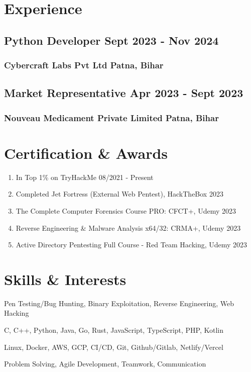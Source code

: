 \documentclass[11pt]{article} %
\begin{document}
\section{Experience}
\subsection{Python Developer \hfill Sept 2023 - Nov 2024}
\subsubsection{Cybercraft Labs Pvt Ltd \hfill Patna, Bihar}
\vspace{8pt}
\subsection{Market Representative \hfill Apr 2023 - Sept 2023}
\subsubsection{Nouveau Medicament Private Limited \hfill Patna, Bihar}

\vspace{18pt}

\section{Certification \& Awards}
\begin{enumerate}[label=\null, left=0pt..0pt, itemsep=0pt]
	\item In Top 1\% on TryHackMe \hfill 08/2021 - Present
  \item Completed Jet Fortress (External Web Pentest), HackTheBox \hfill 2023
	\item The Complete Computer Forensics Course PRO: CFCT+, Udemy \hfill 2023
	\item Reverse Engineering \& Malware Analysis x64/32: CRMA+, Udemy \hfill 2023
	\item Active Directory Pentesting Full Course - Red Team Hacking, Udemy \hfill 2023
\end{enumerate}

\section{Skills \& Interests}
\begin{description}[itemsep=0pt]
  \item[Hacking] Pen Testing/Bug Hunting, Binary Exploitation, Reverse Engineering, Web Hacking
	\item[Programming] C, C++, Python, Java, Go, Rust, JavaScript, TypeScript, PHP, Kotlin
	\item[DevOps] Linux, Docker, AWS, GCP, CI/CD, Git, Github/Gitlab, Netlify/Vercel
	\item[Soft Skills] Problem Solving, Agile Development, Teamwork, Communication
\end{description}
\end{document}
